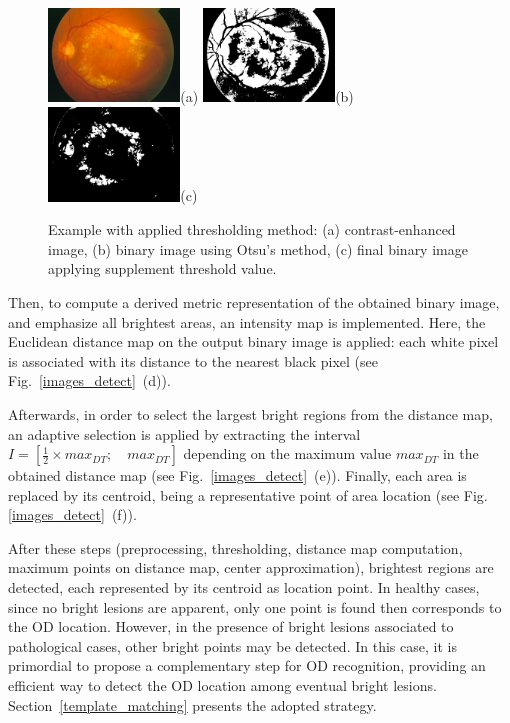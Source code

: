 \begin{figure}[h]
    \centering
    \includegraphics[width=3.5cm]{Images/Methode/Detection/im0002/im0002_.jpg}{(a)}
    \includegraphics[width=3.5cm]{Images/Methode/Detection/im0002/image_seuillee.jpg}{(b)}
    \includegraphics[width=3.5cm]{Images/Methode/Detection/im0002/2_image_seuillee.jpg}{(c)}
    \caption{\label{threshold}Example with applied thresholding method: (a) contrast-enhanced image, (b) binary image using Otsu's method, (c) final binary image applying supplement threshold value.}
\end{figure}

Then, to compute a derived metric representation of the obtained binary image, and emphasize all brightest areas, an intensity map is implemented. Here, the Euclidean distance map on the output binary image is applied: each white pixel is associated with its distance to the nearest black pixel \citep{xiong} (see \mbox{Fig. \ref{images_detect} (d)}).

Afterwards, in order to select the largest bright regions from the distance map, an adaptive selection is applied by extracting the interval $I = [\frac{1}{2} \times max_{DT}; \quad max_{DT}]$ depending on the maximum value $max_{DT}$ in the obtained distance map (see \mbox{Fig. \ref{images_detect} (e)}).
Finally, each area is replaced by its centroid, being a representative point of area location (see Fig. \mbox{\ref{images_detect} (f)}). 

\bigbreak

After these steps (preprocessing, thresholding, distance map computation, maximum points on distance map, center approximation), brightest regions are detected, each represented by its centroid as location point. 
In healthy cases, since no bright lesions are apparent, only one point is found then corresponds to the OD location. However, in the presence of bright lesions associated to pathological cases, other bright points may be detected. In this case, it is primordial to propose a complementary step for OD recognition, providing an efficient way to detect the OD location among eventual bright lesions. \mbox{Section \ref{template_matching}} presents the adopted strategy.


